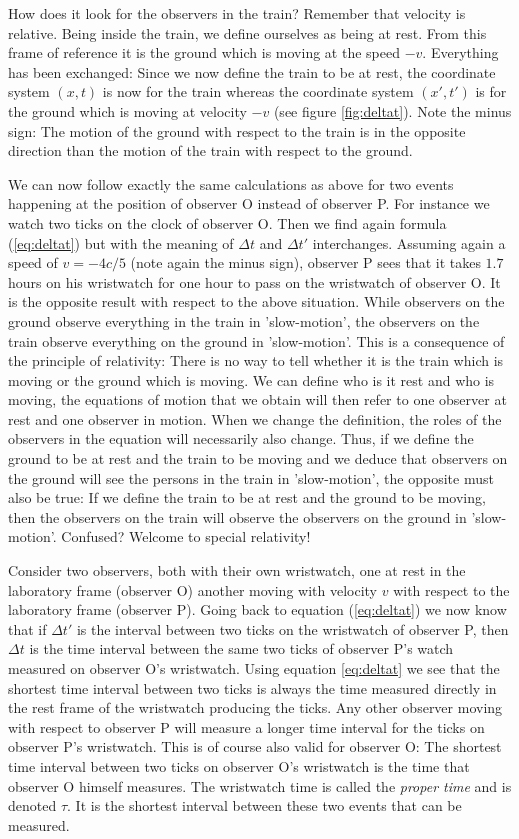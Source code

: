 {\begin{multicols}{2}
How does it look for the observers in the train? Remember that velocity is relative. Being inside the train, we define ourselves as being at rest. From this frame of reference it is the ground which is moving at the speed $-v$. Everything has been exchanged: Since we now define the train to be at rest, the coordinate system $(x,t)$ is now for the train whereas the coordinate system $(x',t')$ is for the ground which is moving at velocity $-v$ (see figure \ref{fig:deltat}). Note the minus sign: The motion of the ground with respect to the train is in the opposite direction than the motion of the train with respect to the ground. 

We can now follow exactly the same calculations as above for two events happening at the position of observer O instead of observer P. For instance we watch two ticks on the clock of observer O. Then we find again formula (\ref{eq:deltat}) but with the meaning of $\Delta t$ and $\Delta t'$ interchanges. Assuming again a speed of $v=-4c/5$ (note again the minus sign), observer P sees that it takes $1.7$ hours on his wristwatch for one hour to pass on the wristwatch of observer O. It is the opposite result with respect to the above situation. While observers on the ground observe everything in the train in 'slow-motion', the observers on the train observe everything on the ground in 'slow-motion'. This is a consequence of the principle of relativity: There is no way to tell whether it is the train which is moving or the ground which is moving. We can define who is it rest and who is moving, the equations of motion that we obtain will then refer to one observer at rest and one observer in motion. When we change the definition, the roles of the observers in the equation will necessarily also change. Thus, if we define the ground to be at rest and the train to be moving and we deduce that observers on the ground will see the persons in the train in 'slow-motion', the opposite must also be true: If we define the train to be at rest and the ground to be moving, then the observers on the train will observe the observers on the ground in 'slow-motion'. Confused? Welcome to special relativity!

Consider two observers, both with their own wristwatch, one at rest in the laboratory frame (observer O) another moving with velocity $v$ with respect to the laboratory frame (observer P). Going back to equation (\ref{eq:deltat}) we now know that if $\Delta t'$ is the interval between two ticks on the wristwatch of observer P, then $\Delta t$ is the time interval between the same two ticks of observer P's watch measured on observer O's wristwatch. Using equation \ref{eq:deltat} we see that {the shortest time interval between two ticks is always the time measured directly in the rest frame of the wristwatch producing the ticks.} Any other observer moving with respect to observer P will measure a longer time interval for the ticks on observer P's wristwatch. This is of course also valid for observer O: The shortest time interval between two ticks on observer O's wristwatch is the time that observer O himself measures. The wristwatch time is called the {\it proper time} and is denoted $\tau$. It is the shortest interval between these two events that can be measured.


\end{multicols}}

